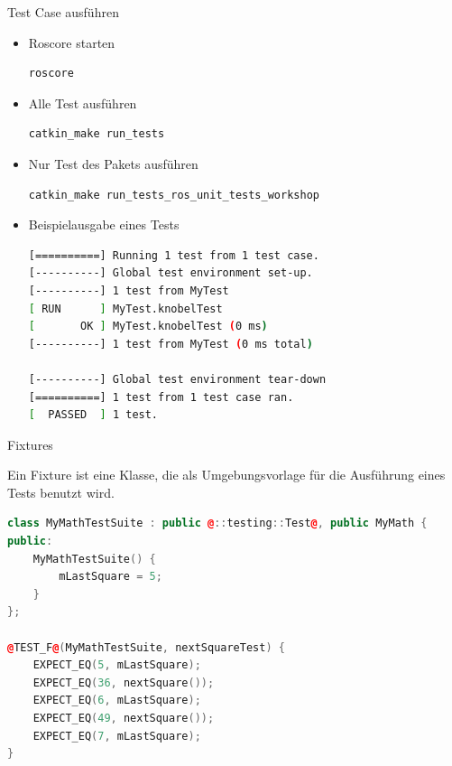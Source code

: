 \documentclass{beamer}
\begin{document}
\begin{frame}[fragile]{Test Case ausführen}
\begin{itemize}
\item Roscore starten
\begin{lstlisting}[language=bash, numbers=none]
roscore
\end{lstlisting}
\item Alle Test ausführen
\begin{lstlisting}[language=bash, numbers=none]
catkin_make run_tests
\end{lstlisting}
\item Nur Test des Pakets ausführen
\begin{lstlisting}[language=bash, numbers=none]
catkin_make run_tests_ros_unit_tests_workshop
\end{lstlisting}
\item Beispielausgabe eines Tests
\begin{lstlisting}[language=bash, numbers=none]
[==========] Running 1 test from 1 test case.
[----------] Global test environment set-up.
[----------] 1 test from MyTest
[ RUN      ] MyTest.knobelTest
[       OK ] MyTest.knobelTest (0 ms)
[----------] 1 test from MyTest (0 ms total)

[----------] Global test environment tear-down
[==========] 1 test from 1 test case ran.
[  PASSED  ] 1 test.
\end{lstlisting}
\end{itemize}
\end{frame}


\begin{frame}[fragile]{Fixtures}
\begin{Definition}
Ein Fixture ist eine Klasse, die als Umgebungsvorlage für die Ausführung eines Tests benutzt wird. 
\end{Definition}
\pause
\begin{lstlisting}[language=c++, style=using_colors]
class MyMathTestSuite : public @::testing::Test@, public MyMath {
public:
    MyMathTestSuite() {
    	mLastSquare = 5;
    }
};

@TEST_F@(MyMathTestSuite, nextSquareTest) {
	EXPECT_EQ(5, mLastSquare);
	EXPECT_EQ(36, nextSquare());
	EXPECT_EQ(6, mLastSquare);
	EXPECT_EQ(49, nextSquare());
	EXPECT_EQ(7, mLastSquare);
}
\end{lstlisting}
\end{frame}
\end{document}
